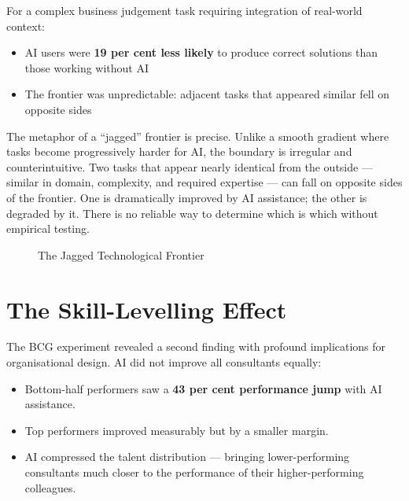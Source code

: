 \begin{cautionbox}[title={Outside the Frontier}]
For a complex business judgement task requiring integration of real-world context:
\begin{itemize}
  \item AI users were \textbf{19 per cent less likely} to produce correct solutions than those working without AI
  \item The frontier was unpredictable: adjacent tasks that appeared similar fell on opposite sides
\end{itemize}
\end{cautionbox}

The metaphor of a ``jagged'' frontier is precise. Unlike a smooth gradient where tasks become progressively harder for AI, the boundary is irregular and counterintuitive. Two tasks that appear nearly identical from the outside --- similar in domain, complexity, and required expertise --- can fall on opposite sides of the frontier. One is dramatically improved by AI assistance; the other is degraded by it. There is no reliable way to determine which is which without empirical testing.

\begin{figure}[h]
\centering
{}
\caption{The Jagged Technological Frontier}
\label{fig:jagged-frontier}
\end{figure}

\section{The Skill-Levelling Effect}

The BCG experiment revealed a second finding with profound implications for organisational design. AI did not improve all consultants equally:

\begin{itemize}
  \item Bottom-half performers saw a \textbf{43 per cent performance jump} with AI assistance.
  \item Top performers improved measurably but by a smaller margin.
  \item AI compressed the talent distribution --- bringing lower-performing consultants much closer to the performance of their higher-performing colleagues.
\end{itemize}

